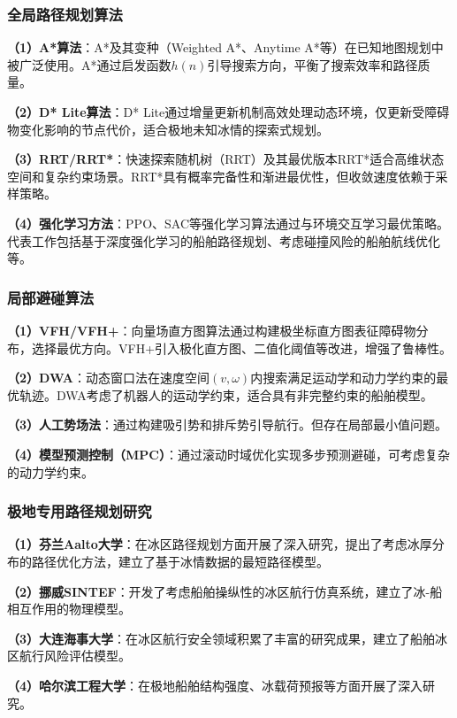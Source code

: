 \documentclass[12pt,a4paper]{ctexbook}
\begin{document}
\subsubsection{全局路径规划算法}

\textbf{（1）A*算法}：A*及其变种（Weighted A*、Anytime A*等）在已知地图规划中被广泛使用。A*通过启发函数$h(n)$引导搜索方向，平衡了搜索效率和路径质量。

\textbf{（2）D* Lite算法}：D* Lite通过增量更新机制高效处理动态环境，仅更新受障碍物变化影响的节点代价，适合极地未知冰情的探索式规划。

\textbf{（3）RRT/RRT*}：快速探索随机树（RRT）及其最优版本RRT*适合高维状态空间和复杂约束场景。RRT*具有概率完备性和渐进最优性，但收敛速度依赖于采样策略。

\textbf{（4）强化学习方法}：PPO、SAC等强化学习算法通过与环境交互学习最优策略。代表工作包括基于深度强化学习的船舶路径规划、考虑碰撞风险的船舶航线优化等。

\subsubsection{局部避碰算法}

\textbf{（1）VFH/VFH+}：向量场直方图算法通过构建极坐标直方图表征障碍物分布，选择最优方向。VFH+引入极化直方图、二值化阈值等改进，增强了鲁棒性。

\textbf{（2）DWA}：动态窗口法在速度空间$(v, \omega)$内搜索满足运动学和动力学约束的最优轨迹。DWA考虑了机器人的运动学约束，适合具有非完整约束的船舶模型。

\textbf{（3）人工势场法}：通过构建吸引势和排斥势引导航行。但存在局部最小值问题。

\textbf{（4）模型预测控制（MPC）}：通过滚动时域优化实现多步预测避碰，可考虑复杂的动力学约束。

\subsubsection{极地专用路径规划研究}

\textbf{（1）芬兰Aalto大学}：在冰区路径规划方面开展了深入研究，提出了考虑冰厚分布的路径优化方法，建立了基于冰情数据的最短路径模型。

\textbf{（2）挪威SINTEF}：开发了考虑船舶操纵性的冰区航行仿真系统，建立了冰-船相互作用的物理模型。

\textbf{（3）大连海事大学}：在冰区航行安全领域积累了丰富的研究成果，建立了船舶冰区航行风险评估模型。

\textbf{（4）哈尔滨工程大学}：在极地船舶结构强度、冰载荷预报等方面开展了深入研究。
\end{document}
